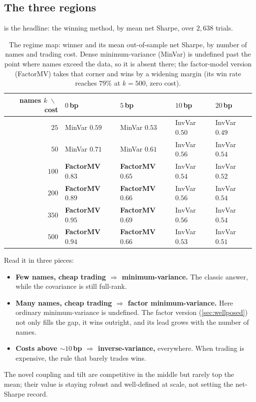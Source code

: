 \documentclass[11pt]{article}
\begin{document}
\subsection{The three regions}
 is the headline: the winning method, by mean net Sharpe, over
$2{,}638$ trials.
\begin{table}[t]
  \centering
  \small
  \begin{tabular}{r llll}
    \toprule
    names $k\;\backslash\;$ cost & $0$\,bp & $5$\,bp & $10$\,bp & $20$\,bp \\
    \midrule
    $25$  & MinVar $0.59$ & MinVar $0.53$ & InvVar $0.50$ & InvVar $0.49$ \\
    $50$  & MinVar $0.71$ & MinVar $0.61$ & InvVar $0.56$ & InvVar $0.54$ \\
    $100$ & \textbf{FactorMV} $0.83$ & \textbf{FactorMV} $0.65$ & InvVar $0.54$ & InvVar $0.52$ \\
    $200$ & \textbf{FactorMV} $0.89$ & \textbf{FactorMV} $0.66$ & InvVar $0.56$ & InvVar $0.54$ \\
    $350$ & \textbf{FactorMV} $0.95$ & \textbf{FactorMV} $0.69$ & InvVar $0.56$ & InvVar $0.54$ \\
    $500$ & \textbf{FactorMV} $0.94$ & \textbf{FactorMV} $0.66$ & InvVar $0.53$ & InvVar $0.51$ \\
    \bottomrule
  \end{tabular}
  \caption{The regime map: winner and its mean out-of-sample net Sharpe, by number
  of names and trading cost. Dense minimum-variance (MinVar) is undefined
  past the point where names exceed the data, so it is absent there; the
  factor-model version (FactorMV) takes that corner and wins by a widening margin
  (its win rate reaches $79\%$ at $k{=}500$, zero cost).}
  \label{tab:regime}
\end{table}
Read it in three pieces:
\begin{itemize}
  \item \textbf{Few names, cheap trading $\Rightarrow$ minimum-variance.} The
    classic answer, while the covariance is still full-rank.
  \item \textbf{Many names, cheap trading $\Rightarrow$ factor minimum-variance.}
    Here ordinary minimum-variance is undefined. The factor version
    (\cref{sec:wellposed}) not only fills the gap, it wins outright, and
    its lead grows with the number of names.
  \item \textbf{Costs above ${\sim}10$\,bp $\Rightarrow$ inverse-variance,}
    everywhere. When trading is expensive, the rule that barely trades wins.
\end{itemize}
The novel coupling and tilt are competitive in the middle but rarely top the
mean; their value is staying robust and well-defined at scale, not setting the
net-Sharpe record.
\end{document}
